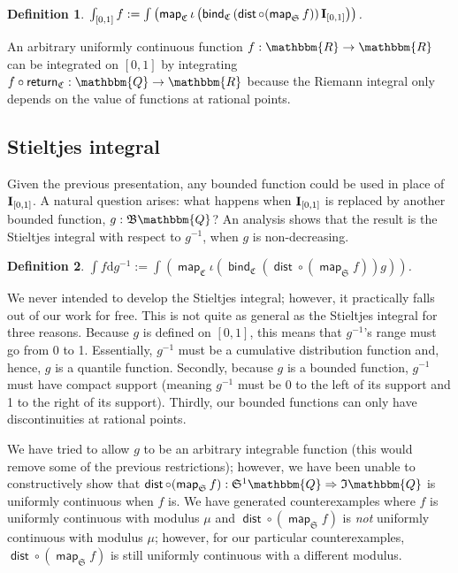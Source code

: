 \documentclass{elsarticle}
\newcommand{\assign}{:=}
\newcommand{\mathd}{\mathrm{d}}
\newcommand{\tmem}[1]{{\em #1\/}}
\newcommand{\tmop}[1]{\ensuremath{\operatorname{#1}}}
\newcommand{\tmstrong}[1]{\textbf{#1}}
\newcommand{\tmtextup}[1]{{\upshape{#1}}}
\newcommand{\um}{-}
\newtheorem{definition}{Definition}
\newcommand{\arr}{\ensuremath{\rightarrow}}
\newcommand{\C}{\ensuremath{\mathfrak{C}}}
\newcommand{\fastBind}{\ensuremath{\tmop{\mathsf{bind}}}}
\newcommand{\SF}{\ensuremath{\mathfrak{S}}}
\newcommand{\BF}{\ensuremath{\mathfrak{B}}}
\newcommand{\IF}{\ensuremath{\mathfrak{I}}}
\newcommand{\id}{\text{{\tmstrong{\tmtextup{I}}}}}
\newcommand{\idzeroone}{\ensuremath{\id_{[0, 1]}}}
\begin{document}
\begin{definition}
  $\int_{[0,1]} f \assign \int \left(
  \tmop{\mathsf{map}}_{\C} \iota \left( \fastBind_{\C}  \left(
  \tmop{\mathsf{dist}} \circ ( \tmop{\mathsf{map}}_{\SF} f) \right)
  \idzeroone \right) \right)$.
\end{definition}

An arbitrary uniformly continuous function $f:\mathbbm{R} \arr \mathbbm{R}$
can be integrated on $[0,1]$ by integrating $f \circ
\tmop{\mathsf{return}}_{\C} : \mathbbm{Q} \arr \mathbbm{R}$ because the
Riemann integral only depends on the value of functions at rational points.

\subsection{Stieltjes integral}\label{ss:stieltjes}Given the previous
presentation, any bounded function could be used in place of {\idzeroone}. A
natural question arises: what happens when {\idzeroone} is replaced by another
bounded function, $g : \BF \mathbbm{Q}$? An analysis shows that the result is
the Stieltjes integral with respect to $g^{\um 1}$, when $g$ is non-decreasing.

\begin{definition}
  $\int f \mathd g^{\um 1} \assign \int \left(
  \tmop{\mathsf{map}}_{\C} \iota \left( \fastBind_{\C}  \left(
  \tmop{\mathsf{dist}} \circ \left( \tmop{\mathsf{map}}_{\SF} f \right)
  \right) g \right) \right)$.
\end{definition}

We never intended to develop the Stieltjes integral; however, it practically
falls out of our work for free. This is not quite as general as the Stieltjes
integral for three reasons. Because $g$ is defined on $[0,1]$, this means that
$g^{\um 1}$'s range must go from 0 to 1. Essentially, $g^{\um 1}$ must be a
cumulative distribution function and, hence, $g$ is a quantile
function. Secondly, because $g$ is a bounded function, $g^{\um 1}$ must have
compact support (meaning $g^{\um 1}$ must be 0 to the left of its support and
1 to the right of its support). Thirdly, our bounded functions can only have
discontinuities at rational points.

We have tried to allow $g$ to be an arbitrary integrable function (this would
remove some of the previous restrictions); however, we have been unable to
constructively show that $\tmop{\mathsf{dist}} \circ (
\tmop{\mathsf{map}}_{\SF} f) : \SF^1 \mathbbm{Q} \Rightarrow \IF \mathbbm{Q}$
is uniformly continuous when $f$ is. We have generated counterexamples where
$f$ is uniformly continuous with modulus $\mu$ and $\tmop{\mathsf{dist}} \circ
( \tmop{\mathsf{map}}_{\SF} f)$ is {\tmem{not}} uniformly continuous with
modulus $\mu$; however, for our particular counterexamples,
$\tmop{\mathsf{dist}} \circ ( \tmop{\mathsf{map}}_{\SF} f)$ is still uniformly
continuous with a different modulus.
\end{document}
